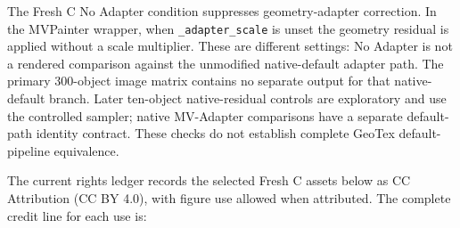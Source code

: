 \documentclass[11pt]{article}
\begin{document}
The Fresh C No Adapter condition suppresses geometry-adapter correction. In the MVPainter wrapper, when \texttt{\_adapter\_scale} is unset the geometry residual is applied without a scale multiplier. These are different settings: No Adapter is not a rendered comparison against the unmodified native-default adapter path. The primary 300-object image matrix contains no separate output for that native-default branch. Later ten-object native-residual controls are exploratory and use the controlled sampler; native MV-Adapter comparisons have a separate default-path identity contract. These checks do not establish complete GeoTex default-pipeline equivalence.

The current rights ledger records the selected Fresh C assets below as CC Attribution (CC BY 4.0), with figure use allowed when attributed. The complete credit line for each use is:
\end{document}
